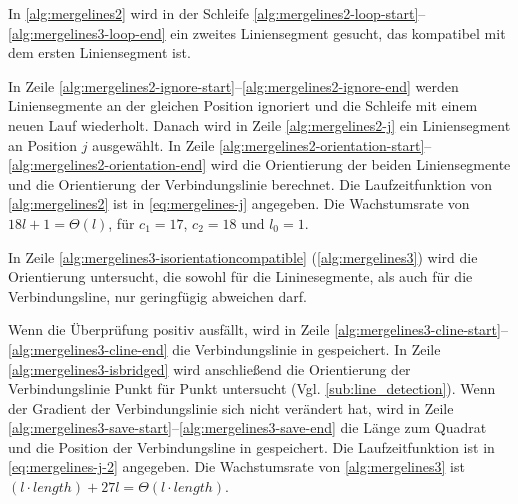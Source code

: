 In \autoref{alg:mergelines2} wird in der Schleife \ref{alg:mergelines2-loop-start}--\ref{alg:mergelines3-loop-end} ein
 zweites Liniensegment gesucht, das kompatibel mit dem ersten Liniensegment ist.

In Zeile \ref{alg:mergelines2-ignore-start}--\ref{alg:mergelines2-ignore-end} werden Liniensegmente an der gleichen
 Position ignoriert und die Schleife mit einem neuen Lauf wiederholt. Danach wird in Zeile \ref{alg:mergelines2-j} ein
 Liniensegment an Position $j$ ausgewählt. In Zeile
 \ref{alg:mergelines2-orientation-start}--\ref{alg:mergelines2-orientation-end} wird die Orientierung der beiden
 Liniensegmente und die Orientierung der Verbindungslinie berechnet. Die Laufzeitfunktion von \autoref{alg:mergelines2}
 ist in \autoref{eq:mergelines-j} angegeben. Die Wachstumsrate von $18l + 1 = \Theta(l)$, für $c_{1} = 17$,
 $c_{2} = 18$ und $l_{0} = 1$.

In Zeile \ref{alg:mergelines3-isorientationcompatible} (\autoref{alg:mergelines3}) wird die Orientierung untersucht,
 die sowohl für die Lininesegmente, als auch für die Verbindungsline, nur geringfügig abweichen darf.

Wenn die Überprüfung positiv ausfällt, wird in Zeile \ref{alg:mergelines3-cline-start}--\ref{alg:mergelines3-cline-end}
 die Verbindungslinie in  gespeichert. In Zeile \ref{alg:mergelines3-isbridged} wird anschließend die
 Orientierung der Verbindungslinie Punkt für Punkt untersucht (Vgl. \autoref{sub:line_detection}). Wenn der Gradient
 der Verbindungslinie sich nicht verändert hat, wird in Zeile
 \ref{alg:mergelines3-save-start}--\ref{alg:mergelines3-save-end} die Länge zum Quadrat und die Position der
 Verbindungsline in  gespeichert. Die Laufzeitfunktion ist in \autoref{eq:mergelines-j-2}
 angegeben. Die Wachstumsrate von \autoref{alg:mergelines3} ist
 $(l \cdot \mathit{length}) + 27l = \Theta(l \cdot \mathit{length})$.


